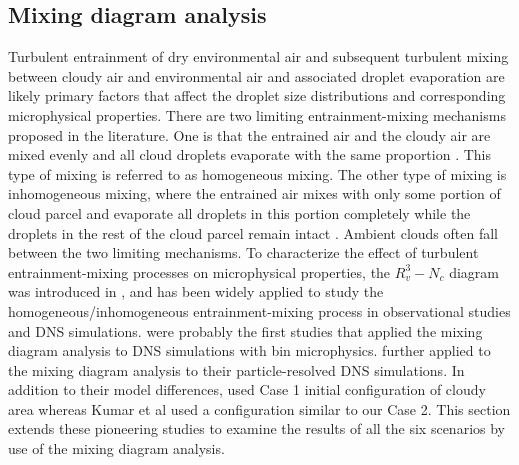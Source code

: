 \documentclass[draft,jgrga]{AGUTeX}
\begin{document}
\begin{article}
\subsection{Mixing diagram analysis}
Turbulent entrainment of dry environmental air and subsequent turbulent mixing between cloudy air and environmental air and associated droplet evaporation are likely primary factors that affect the droplet size distributions and corresponding microphysical properties. There are two limiting entrainment-mixing mechanisms proposed in the literature. One is that the entrained air and the cloudy air are mixed evenly and all cloud droplets evaporate with the same proportion \cite{Warner1973}. This type of mixing is referred to as homogeneous mixing. The other type of mixing is inhomogeneous mixing, where the entrained air mixes with only some portion of cloud parcel and evaporate all droplets in this portion completely while the droplets in the rest of the cloud parcel remain intact \cite{Baker1980}. Ambient clouds often fall between the two limiting mechanisms. To characterize the effect of turbulent entrainment-mixing processes on microphysical properties, the $R_v^3-N_c$ diagram was introduced in \cite{Burnet2007Observational}, and has been widely applied to study the homogeneous/inhomogeneous entrainment-mixing process in observational studies and DNS simulations. \cite{And04, And06, And09} were probably the first studies that applied the mixing diagram analysis to DNS simulations with bin microphysics. \cite{Kumar14} further applied to the mixing diagram analysis to their particle-resolved DNS simulations. In addition to their model differences,  \cite{And04, And06, And09} used Case 1 initial configuration of cloudy area whereas Kumar et al used a configuration similar to our Case 2. This section extends these pioneering studies to examine the results of all the six scenarios by use of the mixing diagram analysis.


\end{article}
\end{document}
